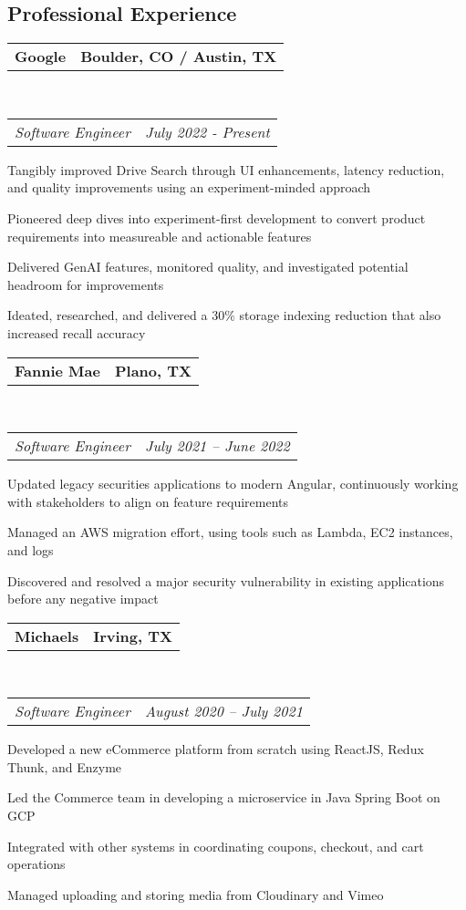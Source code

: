 \documentclass[10pt,letterpaper]{article}
\makeatletter
\newenvironment{indentsection}[1]%
{\begin{list}{}%
	{\setlength{\leftmargin}{#1}}%
	\item[]%
}
{\end{list}}
\newcommand{\headerrow}[2]
{\begin{tabular*}{\linewidth}{l@{\extracolsep{\fill}}r}
	#1 &
	#2 \\
\end{tabular*}}
\makeatother
\begin{document}
\subsection*{Professional Experience}
\begin{indentsection}{\parindent}
	\vspace{-0.4em}
	\headerrow
		{\textbf{Google}}
		{\textbf{Boulder, CO / Austin, TX}}
	\\
	\headerrow
		{\emph{Software Engineer}}
		{\emph{July 2022 - Present}}
	\begin{itemize*}
		\item Tangibly improved Drive Search through UI enhancements, latency reduction, and quality improvements using an experiment-minded approach
		\item Pioneered deep dives into experiment-first development to convert product requirements into measureable and actionable features
		\item Delivered GenAI features, monitored quality, and investigated potential headroom for improvements
		\item Ideated, researched, and delivered a 30\% storage indexing reduction that also increased recall accuracy
	\end{itemize*}
\end{indentsection}
\begin{indentsection}{\parindent}
	\vspace{-0.4em}
	\headerrow
		{\textbf{Fannie Mae}}
		{\textbf{Plano, TX}}
	\\
	\headerrow
		{\emph{Software Engineer}}
		{\emph{July 2021 -- June 2022}}
	\begin{itemize*}
		\item Updated legacy securities applications to modern Angular, continuously working with stakeholders to align on feature requirements 
		\item Managed an AWS migration effort, using tools such as Lambda, EC2 instances, and logs
		\item Discovered and resolved a major security vulnerability in existing applications before any negative impact
	\end{itemize*}
\end{indentsection}
\begin{indentsection}{\parindent}
	\vspace{-0.4em}
	\headerrow
		{\textbf{Michaels}}
		{\textbf{Irving, TX}}
	\\
	\headerrow
		{\emph{Software Engineer}}
		{\emph{August 2020 -- July 2021}}
	\begin{itemize*}
		\item Developed a new eCommerce platform from scratch using ReactJS, Redux Thunk, and Enzyme
		\item Led the Commerce team in developing a microservice in Java Spring Boot on GCP
		\item Integrated with other systems in coordinating coupons, checkout, and cart operations
		\item Managed uploading and storing media from Cloudinary and Vimeo
	\end{itemize*}
\end{indentsection}
\end{document}
